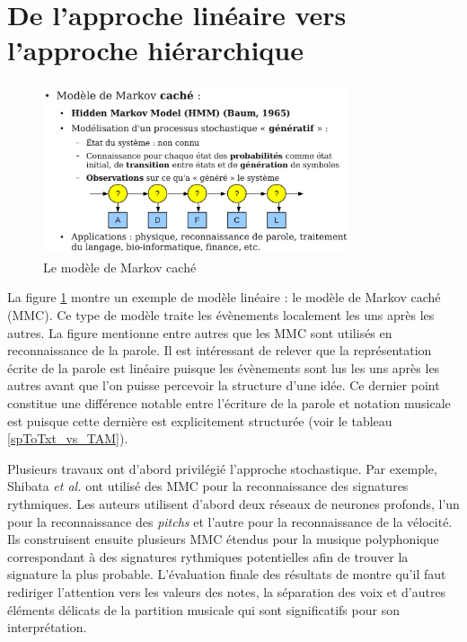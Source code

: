 \section{De l’approche linéaire vers l’approche hiérarchique}

\begin{figure}[h]
	\centering
	\includegraphics[height=50mm, width=90mm]{
    z_images/2_etat_de_l_art/0_hmm.png}
	\caption[Le modèle de Markov caché]{Le modèle de Markov caché\footnotemark}
    \label{mmc}
\end{figure}

La figure \ref{mmc} montre un exemple de modèle linéaire : le modèle de Markov
caché (MMC). Ce type de modèle traite les évènements localement les uns après les
autres. La figure mentionne entre autres que les MMC sont utilisés en
reconnaissance de la parole. Il est intéressant de relever que la
représentation écrite de la parole est linéaire puisque les évènements sont lus
les uns après les autres avant que l’on puisse percevoir la structure d’une
idée. Ce dernier point constitue une différence notable entre l’écriture de la
parole et notation musicale est puisque cette dernière est explicitement
structurée (voir le tableau \ref{spToTxt_vs_TAM}).

Plusieurs travaux ont d’abord privilégié l’approche stochastique. Par exemple,
Shibata \textit{et al.} \cite{shibata} ont utilisé des MMC pour la
reconnaissance des signatures rythmiques. Les auteurs utilisent d’abord deux
réseaux de neurones profonds, l’un pour la reconnaissance des \textit{pitchs}
et l’autre pour la reconnaissance de la vélocité. Ils construisent ensuite
plusieurs MMC étendus pour la musique polyphonique correspondant à des
signatures rythmiques potentielles afin de trouver la signature la plus
probable. L’évaluation finale des résultats de \cite{shibata} montre
qu’il faut  rediriger l’attention vers les
valeurs des notes, la séparation des voix et d'autres éléments délicats de la
partition musicale qui sont significatifs pour son interprétation.

